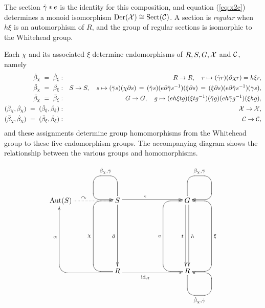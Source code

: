 The section  $\dot{\gamma}*e$  is the identity for this composition,
and equation (\ref{eq:x2c}) determines a monoid isomorphism
$\mathrm{Der}(\mathcal{X}) \cong \mathrm{Sect}(\mathcal{C})$.
A section is  \emph{regular}  when  $h \xi$  is an automorphism of $R$, 
and the group of regular sections is isomorphic to the Whitehead group.

Each  $\chi$  and its associated  $\xi$  determine endomorphisms of  
$R, S, G, \mathcal{X}$ and $\mathcal{C}$, namely 
\begin{eqnarray} \label{eq:five-endos}
   \dot{\beta}_{\chi} ~=~ \dot{\beta}_{\xi}  &  :  &  R \to R, 
                  \quad  r \mapsto (\dot{\gamma} r)(\partial \chi r) = h \xi r,  
\nonumber \\
  \ddot{\beta}_{\chi} ~=~ \ddot{\beta}_{\xi}  &  :  &  S \to S,
                  \quad  s \mapsto (\ddot{\gamma} s)(\chi \partial s) \,
                      = \, (\ddot{\gamma} s)(e\partial\ddot{\gamma} s^{-1})(\xi \partial s) \, 
                      = \, (\xi \partial s)(e\partial\ddot{\gamma} s^{-1})(\ddot{\gamma} s), 
\nonumber \\
 \bar{\beta}_{\chi} ~=~ \bar{\beta}_{\xi}  &  :  &  G \to G,
                  \quad  g \mapsto (eh \xi tg)(\xi tg^{-1})
                           (\bar{\gamma} g)(eh \bar{\gamma} g^{-1})(\xi hg),  \\
  (\ddot{\beta}_{\chi}, \dot{\beta}_{\chi})  ~=~  (\ddot{\beta}_{\xi}, \dot{\beta}_{\xi}) 
    & : & \mathcal{X} \to \mathcal{X}, 
\nonumber \\
  (\bar{\beta}_{\chi}, \dot{\beta}_{\chi})  ~=~  (\bar{\beta}_{\xi}, \dot{\beta}_{\xi}) 
    & : & \mathcal{C} \to \mathcal{C}, 
\nonumber
\end{eqnarray}
and these assignments determine group homomorphisms from the
Whitehead group to these five endomorphism groups.
The accompanying diagram shows the relationship between the various 
groups and homomorphisms.

$$\xy
\xymatrix{
   &&&&&&  \\
  \Aut(S)  \ar @{.} [0,2]^(0.4){\curvearrowright}
    &&  S  \ar[rrr] <+0.5ex>^(0.4){\epsilon} 
           \ar[ddd] _{\partial}  
           \ar `u[ul] `[0,-1]_{\ddb_{\chi},\ddg} 
                          `[0,0]<+0.5ex> [0,0]<+0.5ex>
   &&&  G  \ar[ddd] <+0.5ex>^h  
           \ar[ddd] <-0.5ex>_t
           \ar `u[ur] `[r]^{\barb_{\chi},\barg} 
                      `[0,0]<-0.5ex> [0,0]<-0.5ex>
     &    \\
   &&&&&& \\
   &&&&&& \\
    &&  R  \ar `l [ll]<+0.5ex> [uuull]<+0.5ex>^(0.43){\alpha}
           \ar `l[uuul] `[uuu]^{\chi} [uuu]
           \ar[rrr] <-0.5ex>_(0.4){\id_R}
   &&&  R  \ar `l[uuul] `[uuu]^{e}   [uuu]
           \ar `r[uuur]  `[uuu]_{\xi} [uuu]
           \ar `d[dr] `[r]_{\db_{\chi},\dg} 
                      `[0,0]<+0.5ex> [0,0]<+0.5ex>
     &    \\ 
   &&&&&& \\ 
   &&&&&& \\
}
\endxy$$


